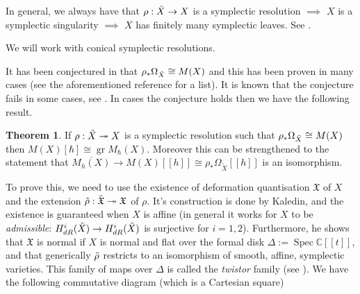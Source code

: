 \documentclass[draft]{article}
\theoremstyle{definition}
\newtheorem{theorem}{Theorem}[section]
\DeclareMathOperator{\Spec}{{Spec}}
\DeclareMathOperator{\gr}{gr}
\begin{document}
In general, we always have that $\rho:\Tilde{X}\to X$ is a symplectic resolution $\implies$ $X$ is a symplectic singularity $\implies$ $X$ has finitely many symplectic leaves. See \cite{Symplectic_singularities_from_the_Poisson_point_of_view}. 

We will work with conical symplectic resolutions.

It has been conjectured in \cite[Section 6]{Poisson_traces_D-modules_and_symplectic_resolutions} that $\rho_* \Omega_{\Tilde{X}}\cong M(X)$ and this has been proven in many cases (see the aforementioned reference for a list). It is known that the conjecture fails in some cases, see \cite[Remark 2.15]{On_categories_O_of_quiver_varieties_overlying_the_bouquet_graphs}. In cases the conjecture holds then we have the following result.

\begin{theorem}\label{SymResMainTheorem}
If $\rho:\Tilde{X}\twoheadrightarrow X$ is a symplectic resolution such that $\rho_* \Omega_{\Tilde{X}}\cong M(X)$ then $M(X)[\hbar]\cong \gr M_\hbar(X)$. Moreover this can be strengthened to the statement that $\overline{M_h(X)} \to M(X)[[h]] \cong \rho_* \Omega_{\tilde X}[[h]]$ is an isomorphism.
\end{theorem}

To prove this, we need to use the existence of deformation quantisation $\mathfrak{X}$ of $X$ and the extension $\Tilde{\rho}:\Tilde{\mathfrak{X}}\twoheadrightarrow \mathfrak{X}$ of $\rho$. It's construction is done by Kaledin, and the existence is guaranteed when $X$ is affine (in general it works for $X$ to be \textit{admissible}: $H^i_{dR}(\Tilde{X})\to H^i_{dR}(\Tilde{X})$ is surjective for $i=1,2$). Furthermore, he shows that $\mathfrak{X}$ is normal if $X$ is normal and flat over the formal disk $\Delta:=\Spec\mathbb{C}[[t]]$, and that generically $\Tilde{\rho}$ restricts to an isomorphism of smooth, affine, symplectic varieties. This family of maps over $\Delta$ is called the \textit{twistor} family (see \cite{Geometry_and_topology_of_symplectic_resolutions}). We have the following commutative diagram (which is a Cartesian square)

\begin{center}
\end{center}
\end{document}
